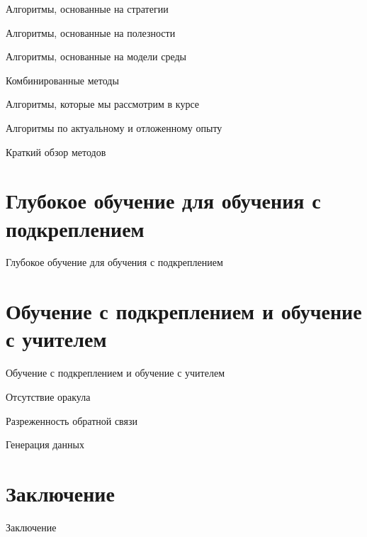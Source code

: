 \documentclass[10pt,aspectratio=169]{beamer}
\begin{document}
\begin{frame}{Алгоритмы, основанные на стратегии}
	
\end{frame}

\begin{frame}{Алгоритмы, основанные на полезности}
	
\end{frame}

\begin{frame}{Алгоритмы, основанные на модели среды}
	
\end{frame}

\begin{frame}{Комбинированные методы}
	
\end{frame}

\begin{frame}{Алгоритмы, которые мы рассмотрим в курсе}
	
\end{frame}

\begin{frame}{Алгоритмы по актуальному и отложенному опыту}
	
\end{frame}

\begin{frame}{Краткий обзор методов}
	
\end{frame}

\section{Глубокое обучение для обучения с подкреплением}

\begin{frame}{Глубокое обучение для обучения с подкреплением}
	
\end{frame}

\section{Обучение с подкреплением и обучение с учителем}

\begin{frame}{Обучение с подкреплением и обучение с учителем}
	
\end{frame}

\begin{frame}{Отсутствие оракула}
	
\end{frame}

\begin{frame}{Разреженность обратной связи}
	
\end{frame}

\begin{frame}{Генерация данных}
	
\end{frame}

\section{Заключение}

\begin{frame}{Заключение}
	
\end{frame}




\backmatter
\end{document}
